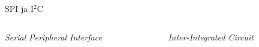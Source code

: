 \documentclass[pdf,draft]{beamer}
\begin{document}
\begin{frame}{SPI ja I\({}^2\)C}
    \begin{columns}
        \begin{column}{0.46\textwidth}
            \begin{block}{\textit{Serial Peripheral Interface}}
            \end{block}
        \end{column}
        \begin{column}{0.46\textwidth}
            \begin{block}{\textit{Inter-Integrated Circuit}}
            \end{block}
        \end{column}
    \end{columns}
\end{frame}
\end{document}
